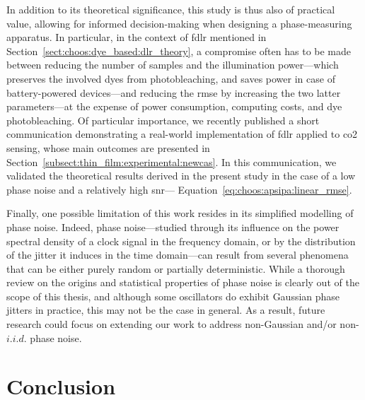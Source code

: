 In addition to its theoretical significance, this study is thus also of practical value, allowing for informed decision-making when designing a phase-measuring apparatus. In particular, in the context of \gls{fdlr} mentioned in Section~\ref{sect:choos:dye_based:dlr_theory}, a compromise often has to be made between reducing the number of samples and the illumination power---which preserves the involved dyes from photobleaching, and saves power in case of battery-powered devices---and reducing the \gls{rmse} by increasing the two latter parameters---at the expense of power consumption, computing costs, and dye photobleaching. Of particular importance, we recently published a short communication demonstrating a real-world implementation of \gls{fdlr} applied to \gls{co2} sensing\cite{dervieux2024newcas}, whose main outcomes are presented in Section~\ref{subsect:thin_film:experimental:newcas}. In this communication, we validated the theoretical results derived in the present study in the case of a low phase noise and a relatively high \gls{snr}---\ie{} Equation~\ref{eq:choos:apsipa:linear_rmse}.

Finally, one possible limitation of this work resides in its simplified modelling of phase noise. Indeed, phase noise---studied through its influence on the power spectral density of a clock signal in the frequency domain\cite{leeson2016}, or by the distribution of the jitter it induces in the time domain\cite{ong2004}---can result from several phenomena that can be either purely random or partially deterministic\cite[Chap.~2--4]{dadalt2018}. While a thorough review on the origins and statistical properties of phase noise is clearly out of the scope of this thesis, and although some oscillators do exhibit Gaussian phase jitters in practice\cite{lesage1973, nazareth2009, ciarpi2023}, this may not be the case in general\cite{ong2004}. As a result, future research could focus on extending our work to address non-Gaussian and/or non-$i.i.d.$ phase noise.

\section{Conclusion}\label{sect:choos:conclusion}

